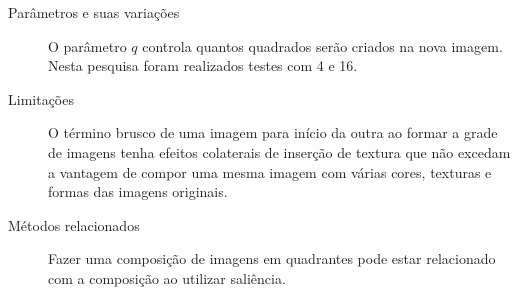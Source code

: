 \begin{description}
  \item[Parâmetros e suas variações] O parâmetro $q$ controla quantos quadrados serão criados na nova imagem. Nesta pesquisa foram realizados testes com 4 e 16.

  \item[Limitações] O término brusco de uma imagem para início da outra ao formar a grade de imagens tenha efeitos colaterais de inserção de textura que não excedam a vantagem de compor uma mesma imagem com várias cores, texturas e formas das imagens originais.

  \item[Métodos relacionados] Fazer uma composição de imagens em quadrantes pode estar relacionado com a composição ao utilizar saliência.

\end{description}
%
